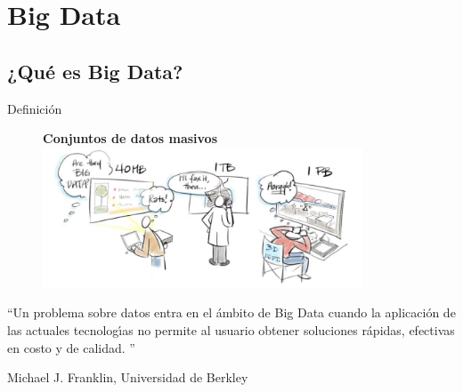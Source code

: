 
\section{Big Data}

	\subsection*{¿Qué es Big Data?}

		\begin{frame}{Definición}
			\kern-0.5cm
			\begin{figure}
				\centering
				\textbf{Conjuntos de datos masivos}
				\includegraphics[width=0.85\textwidth]{./Images/what-is-big-data.png}
			\end{figure}

			\fontsize{8}{8}\selectfont	
			\begin{tcolorbox}[colback=ChetwodeBlue!10,colframe=ChetwodeBlue!60]
				``Un problema sobre datos entra en el ámbito de Big Data cuando la aplicación de las actuales tecnologı́as no permite al usuario obtener soluciones rápidas, efectivas en costo y de calidad. ''
				\begin{flushright}
					Michael J. Franklin, Universidad de Berkley 
				\end{flushright}
			\end{tcolorbox}
		\end{frame}
		
